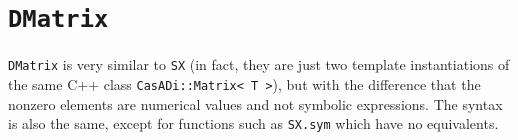 \documentclass[a4paper,12pt]{book}
\newcommand{\CasADi}{\texttt{CasADi}\xspace}
\newcounter{pytexcount}
\newcounter{pytexsubcount}
\renewenvironment{pytex}
{\addtocounter{pytexsubcount}{1}%
\begin{rawhtml}
<div style="color: black; background-color: \#b9c8db;  border-style: dotted; border-width: 1px; padding:2px;padding-left:1em" >
<pre>
\end{rawhtml}
}%
{\begin{rawhtml}
</pre>
</div>
<div style="color: black; background-color: \#fffff;  border-style: solid; border-width: 1px; padding:2px;padding-left:1em;margin-left:1em;" >\end{rawhtml}%
\verbatiminputeval{pytex_\alph{pytexcount}_\arabic{pytexsubcount}.log}%
\begin{rawhtml}
</div>
\end{rawhtml}
}
\begin{document}



\section{\texttt{DMatrix}}
\texttt{DMatrix} is very similar to \texttt{SX} (in fact, they are just two template instantiations of the same C++ class \texttt{CasADi::Matrix<\,T\,>}), but with the difference that the nonzero elements are numerical values and not symbolic expressions. The syntax is also the same, except for functions such as \texttt{SX.sym} which have no equivalents.
\end{document}
